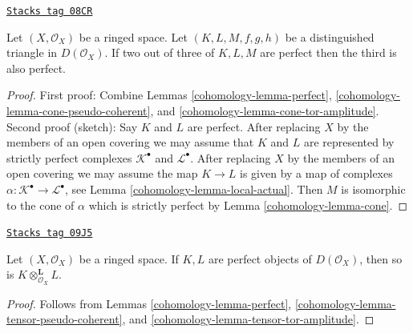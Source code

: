 \begin{lemma}
\label{cohomology-lemma-two-out-of-three-perfect}
\href{https://stacks.math.columbia.edu/tag/08CR}{\texttt{Stacks tag 08CR}}

Let $(X, \mathcal{O}_X)$ be a ringed space. Let $(K, L, M, f, g, h)$
be a distinguished triangle in $D(\mathcal{O}_X)$. If two out of three of
$K, L, M$ are perfect then the third is also perfect.
\end{lemma}

\begin{proof}

First proof: Combine
Lemmas \ref{cohomology-lemma-perfect}, \ref{cohomology-lemma-cone-pseudo-coherent}, and
\ref{cohomology-lemma-cone-tor-amplitude}.
Second proof (sketch): Say $K$ and $L$ are perfect. After replacing
$X$ by the members of an open covering we may assume that $K$ and $L$
are represented by strictly perfect complexes $\mathcal{K}^\bullet$
and $\mathcal{L}^\bullet$. After replacing $X$ by the members
of an open covering we may assume the map $K \to L$ is given by
a map of complexes $\alpha : \mathcal{K}^\bullet \to \mathcal{L}^\bullet$,
see Lemma \ref{cohomology-lemma-local-actual}.
Then $M$ is isomorphic to the cone of $\alpha$ which is strictly
perfect by Lemma \ref{cohomology-lemma-cone}.
\end{proof}

\begin{lemma}
\label{cohomology-lemma-tensor-perfect}
\href{https://stacks.math.columbia.edu/tag/09J5}{\texttt{Stacks tag 09J5}}

Let $(X, \mathcal{O}_X)$ be a ringed space.
If $K, L$ are perfect objects of $D(\mathcal{O}_X)$, then
so is $K \otimes_{\mathcal{O}_X}^\mathbf{L} L$.
\end{lemma}

\begin{proof}

Follows from
Lemmas \ref{cohomology-lemma-perfect}, \ref{cohomology-lemma-tensor-pseudo-coherent}, and
\ref{cohomology-lemma-tensor-tor-amplitude}.
\end{proof}

